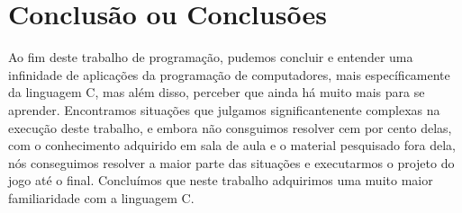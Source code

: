 \documentclass[journal]{IEEEtran}
\begin{document}
\section{Conclusão ou Conclusões}
Ao fim deste trabalho de programação, pudemos concluir e entender uma infinidade de aplicações da programação de computadores, mais específicamente da linguagem C, mas além disso, perceber que ainda há muito mais para se aprender.
Encontramos situações que julgamos significantenente complexas na execução deste trabalho, e embora não consguimos resolver cem por cento delas, com o conhecimento adquirido em sala de aula e o material pesquisado fora dela, nós conseguimos resolver a maior parte das situações e executarmos o projeto do jogo até o final.
Concluímos que neste trabalho adquirimos uma muito maior familiaridade com a linguagem C.
\end{document}
